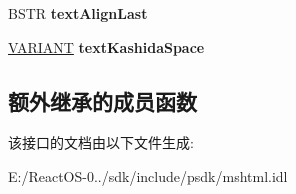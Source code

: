 \begin{DoxyCompactItemize}
\item 
\mbox{\label{interface_m_s_h_t_m_l_1_1_i_h_t_m_l_style3_a1b8de146ced08dc098d63fe47221d6e9}} 
B\+S\+TR {\bfseries text\+Align\+Last}
\item 
\mbox{\label{interface_m_s_h_t_m_l_1_1_i_h_t_m_l_style3_aea631585767900ec65a464c66a72d8c9}} 
\hyperlink{structtag_v_a_r_i_a_n_t}{V\+A\+R\+I\+A\+NT} {\bfseries text\+Kashida\+Space}
\end{DoxyCompactItemize}
\subsection*{额外继承的成员函数}


该接口的文档由以下文件生成\+:\begin{DoxyCompactItemize}
\item 
E\+:/\+React\+O\+S-\/0../sdk/include/psdk/mshtml.\+idl\end{DoxyCompactItemize}
